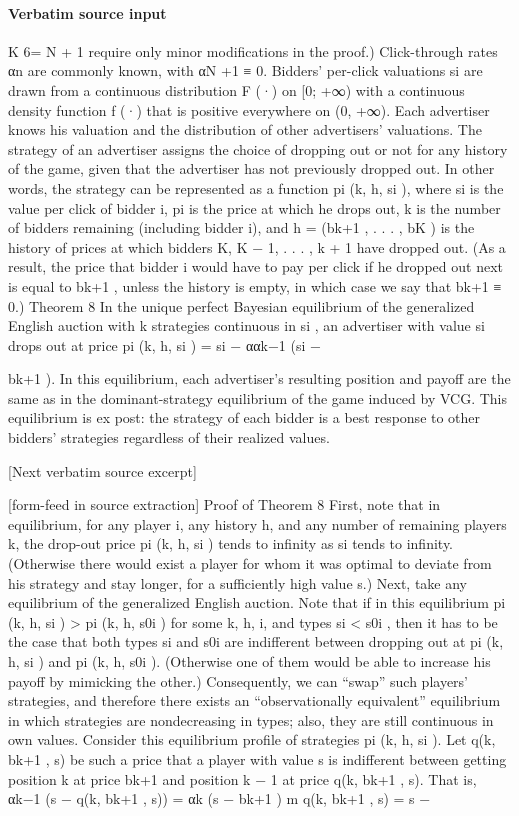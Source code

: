 \documentclass[10pt]{article}
\begin{document}
\paragraph{Verbatim source input}
\begin{ReviewVerbatim}
K 6= N + 1 require only minor modifications in the proof.) Click-through rates αn are commonly
known, with αN +1 ≡ 0. Bidders’ per-click valuations si are drawn from a continuous distribution
F (·) on [0; +∞) with a continuous density function f (·) that is positive everywhere on (0, +∞).
Each advertiser knows his valuation and the distribution of other advertisers’ valuations.
The strategy of an advertiser assigns the choice of dropping out or not for any history of the
game, given that the advertiser has not previously dropped out. In other words, the strategy can be
represented as a function pi (k, h, si ), where si is the value per click of bidder i, pi is the price at which
he drops out, k is the number of bidders remaining (including bidder i), and h = (bk+1 , . . . , bK ) is
the history of prices at which bidders K, K − 1, . . . , k + 1 have dropped out. (As a result, the
price that bidder i would have to pay per click if he dropped out next is equal to bk+1 , unless the
history is empty, in which case we say that bk+1 ≡ 0.)
Theorem 8 In the unique perfect Bayesian equilibrium of the generalized English auction with
k
strategies continuous in si , an advertiser with value si drops out at price pi (k, h, si ) = si − ααk−1
(si −

bk+1 ). In this equilibrium, each advertiser’s resulting position and payoff are the same as in the
dominant-strategy equilibrium of the game induced by VCG. This equilibrium is ex post: the strategy
of each bidder is a best response to other bidders’ strategies regardless of their realized values.

[Next verbatim source excerpt]


[form-feed in source extraction]
Proof of Theorem 8
First, note that in equilibrium, for any player i, any history h, and any number of remaining players
k, the drop-out price pi (k, h, si ) tends to infinity as si tends to infinity. (Otherwise there would
exist a player for whom it was optimal to deviate from his strategy and stay longer, for a sufficiently
high value s.) Next, take any equilibrium of the generalized English auction. Note that if in this
equilibrium pi (k, h, si ) > pi (k, h, s0i ) for some k, h, i, and types si < s0i , then it has to be the
case that both types si and s0i are indifferent between dropping out at pi (k, h, si ) and pi (k, h, s0i ).
(Otherwise one of them would be able to increase his payoff by mimicking the other.) Consequently,
we can “swap” such players’ strategies, and therefore there exists an “observationally equivalent”
equilibrium in which strategies are nondecreasing in types; also, they are still continuous in own
values. Consider this equilibrium profile of strategies pi (k, h, si ).
Let q(k, bk+1 , s) be such a price that a player with value s is indifferent between getting position
k at price bk+1 and position k − 1 at price q(k, bk+1 , s). That is,
αk−1 (s − q(k, bk+1 , s)) = αk (s − bk+1 )
m
q(k, bk+1 , s) = s −


\end{ReviewVerbatim}
\end{document}
